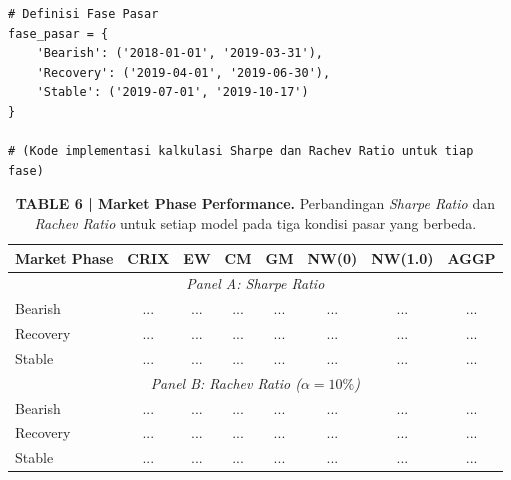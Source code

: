 \documentclass[12pt,a4paper]{article}
\begin{document}
\begin{lstlisting}[caption={Kalkulasi Metrik Berdasarkan Fase Pasar}]
# Definisi Fase Pasar
fase_pasar = {
    'Bearish': ('2018-01-01', '2019-03-31'),
    'Recovery': ('2019-04-01', '2019-06-30'),
    'Stable': ('2019-07-01', '2019-10-17')
}

# (Kode implementasi kalkulasi Sharpe dan Rachev Ratio untuk tiap fase)
\end{lstlisting}

\begin{table}[h]
    \centering
    \footnotesize
    \caption{\textbf{TABLE 6 | Market Phase Performance.} Perbandingan \textit{Sharpe Ratio} dan \textit{Rachev Ratio} untuk setiap model pada tiga kondisi pasar yang berbeda.}
    \begin{tabular}{lccccccc}
        \toprule
        Market Phase & CRIX & EW & CM & GM & NW(0) & NW(1.0) & AGGP \\
        \midrule
        \multicolumn{8}{c}{\textit{Panel A: Sharpe Ratio}} \\
        Bearish  & ... & ... & ... & ... & ... & ... & ... \\
        Recovery & ... & ... & ... & ... & ... & ... & ... \\
        Stable   & ... & ... & ... & ... & ... & ... & ... \\
        \midrule
        \multicolumn{8}{c}{\textit{Panel B: Rachev Ratio ($\alpha=10\%$)}} \\
        Bearish  & ... & ... & ... & ... & ... & ... & ... \\
        Recovery & ... & ... & ... & ... & ... & ... & ... \\
        Stable   & ... & ... & ... & ... & ... & ... & ... \\
        \bottomrule
    \end{tabular}
\end{table}
\end{document}
